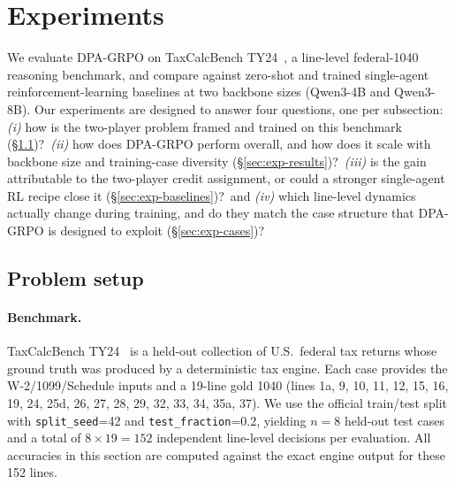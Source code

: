 %
%   
%

\section{Experiments}
\label{sec:experiments}

We evaluate DPA-GRPO on TaxCalcBench TY24~\citep{bock2025taxcalcbench}, a
line-level federal-1040 reasoning benchmark, and compare against zero-shot
and trained single-agent reinforcement-learning baselines at two backbone
sizes (Qwen3-4B and Qwen3-8B). Our experiments are designed to answer
four questions, one per subsection: \emph{(i)} how is the two-player
problem framed and trained on this benchmark
(\S\ref{sec:exp-setup})?\ \emph{(ii)} how does DPA-GRPO perform overall,
and how does it scale with backbone size and training-case diversity
(\S\ref{sec:exp-results})?\ \emph{(iii)} is the gain attributable to the
two-player credit assignment, or could a stronger single-agent RL recipe
close it (\S\ref{sec:exp-baselines})?\ and \emph{(iv)} which line-level
dynamics actually change during training, and do they match the case
structure that DPA-GRPO is designed to exploit
(\S\ref{sec:exp-cases})?

\subsection{Problem setup}
\label{sec:exp-setup}

\paragraph{Benchmark.}
TaxCalcBench TY24~\citep{bock2025taxcalcbench} is a held-out collection
of U.S.\ federal tax returns whose ground truth was produced by a
deterministic tax engine. Each case provides the W-2/1099/Schedule
inputs and a 19-line gold 1040 (lines 1a, 9, 10, 11, 12, 15, 16, 19, 24,
25d, 26, 27, 28, 29, 32, 33, 34, 35a, 37). We use the official
train/test split with \texttt{split\_seed}=42 and
\texttt{test\_fraction}=0.2, yielding $n{=}8$ held-out test cases and a
total of $8\times 19 = 152$ independent line-level decisions per
evaluation. All accuracies in this section are computed against the
exact engine output for these 152 lines.

